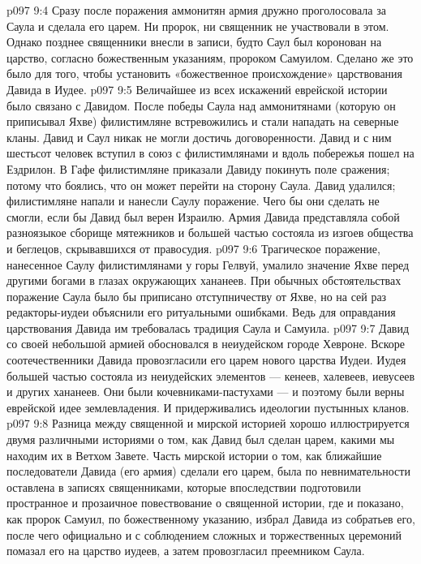 \vs p097 9:4 Сразу после поражения аммонитян армия дружно проголосовала за Саула и сделала его царем. Ни пророк, ни священник не участвовали в этом. Однако позднее священники внесли в записи, будто Саул был коронован на царство, согласно божественным указаниям, пророком Самуилом. Сделано же это было для того, чтобы установить «божественное происхождение» царствования Давида в Иудее.
\vs p097 9:5 Величайшее из всех искажений еврейской истории было связано с Давидом. После победы Саула над аммонитянами (которую он приписывал Яхве) филистимляне встревожились и стали нападать на северные кланы. Давид и Саул никак не могли достичь договоренности. Давид и с ним шестьсот человек вступил в союз с филистимлянами и вдоль побережья пошел на Ездрилон. В Гафе филистимляне приказали Давиду покинуть поле сражения; потому что боялись, что он может перейти на сторону Саула. Давид удалился; филистимляне напали и нанесли Саулу поражение. Чего бы они сделать не смогли, если бы Давид был верен Израилю. Армия Давида представляла собой разноязыкое сборище мятежников и большей частью состояла из изгоев общества и беглецов, скрывавшихся от правосудия.
\vs p097 9:6 Трагическое поражение, нанесенное Саулу филистимлянами у горы Гелвуй, умалило значение Яхве перед другими богами в глазах окружающих хананеев. При обычных обстоятельствах поражение Саула было бы приписано отступничеству от Яхве, но на сей раз редакторы\hyp{}иудеи объяснили его ритуальными ошибками. Ведь для оправдания царствования Давида им требовалась традиция Саула и Самуила.
\vs p097 9:7 Давид со своей небольшой армией обосновался в неиудейском городе Хевроне. Вскоре соотечественники Давида провозгласили его царем нового царства Иудеи. Иудея большей частью состояла из неиудейских элементов --- кенеев, халевеев, иевусеев и других хананеев. Они были кочевниками\hyp{}пастухами --- и поэтому были верны еврейской идее землевладения. И придерживались идеологии пустынных кланов.
\vs p097 9:8 \pc Разница между священной и мирской историей хорошо иллюстрируется двумя различными историями о том, как Давид был сделан царем, какими мы находим их в Ветхом Завете. Часть мирской истории о том, как ближайшие последователи Давида (его армия) сделали его царем, была по невнимательности оставлена в записях священниками, которые впоследствии подготовили пространное и прозаичное повествование о священной истории, где и показано, как пророк Самуил, по божественному указанию, избрал Давида из собратьев его, после чего официально и с соблюдением сложных и торжественных церемоний помазал его на царство иудеев, а затем провозгласил преемником Саула.

